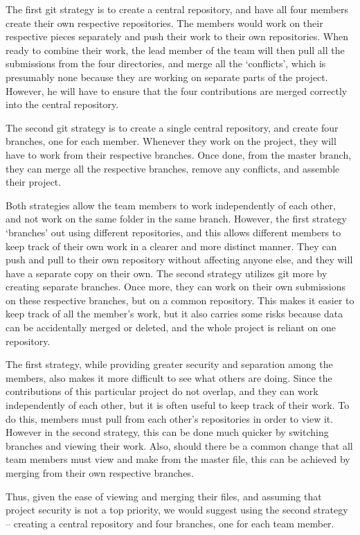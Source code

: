 \documentclass[12pt]{article}
\begin{document}
The first git strategy is to create a central repository, and have all four members create their own respective repositories. The members would work on their respective pieces separately and push their work to their own repositories. When ready to combine their work, the lead member of the team will then pull all the submissions from the four directories, and merge all the ‘conflicts’, which is presumably none because they are working on separate parts of the project. However, he will have to ensure that the four contributions are merged correctly into the central repository. 

The second git strategy is to create a single central repository, and create four branches, one for each member. Whenever they work on the project, they will have to work from their respective branches. Once done, from the master branch, they can merge all the respective branches, remove any conflicts, and assemble their project. 

Both strategies allow the team members to work independently of each other, and not work on the same folder in the same branch. However, the first strategy ‘branches’ out using different repositories, and this allows different members to keep track of their own work in a clearer and more distinct manner. They can push and pull to their own repository without affecting anyone else, and they will have a separate copy on their own. The second strategy utilizes git more by creating separate branches. Once more, they can work on their own submissions on these respective branches, but on a common repository. This makes it easier to keep track of all the member’s work, but it also carries some risks because data can be accidentally merged or deleted, and the whole project is reliant on one repository. 

The first strategy, while providing greater security and separation among the members, also makes it more difficult to see what others are doing. Since the contributions of this particular project do not overlap, and they can work independently of each other, but it is often useful to keep track of their work. To do this, members must pull from each other’s repositories in order to view it. However in the second strategy, this can be done much quicker by switching branches and viewing their work. Also, should there be a common change that all team members must view and make from the master file, this can be achieved by merging from their own respective branches. 

Thus, given the ease of viewing and merging their files, and assuming that project security is not a top priority, we would suggest using the second strategy – creating a central repository and four branches, one for each team member. 
\end{document}
